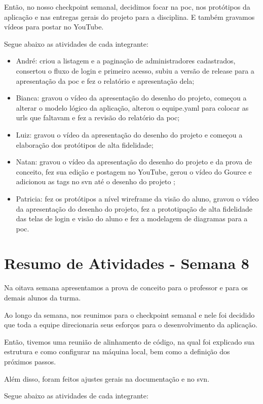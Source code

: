 \documentclass[
    12pt,               %
    openright,          %
    oneside,
    a4paper,            %
    english,            %
    brazil              %
    ]{ifsp-spo-inf-ctds} %
\begin{document}
\begin{apendicesenv}
Então, no nosso checkpoint semanal, decidimos focar na \ac{poc}, nos protótipos da aplicação e nas entregas gerais do projeto para a disciplina. E também gravamos vídeos para postar no YouTube.

Segue abaixo as atividades de cada integrante:

\begin{itemize}
\item André: criou a listagem e a paginação de administradores cadastrados, consertou o fluxo de login e primeiro acesso, subiu a versão de \gls{release} para a apresentação da \ac{poc} e fez o relatório e apresentação dela;
\item Bianca: gravou o vídeo da apresentação do desenho do projeto, começou a alterar o modelo lógico da aplicação, alterou o equipe.yaml para colocar as \ac{url}s que faltavam e fez a revisão do relatório da \ac{poc};
\item Luiz: gravou o vídeo da apresentação do desenho do projeto e começou a elaboração dos protótipos de alta fidelidade;
\item Natan: gravou o vídeo da apresentação do desenho do projeto e da prova de conceito, fez sua edição e postagem no YouTube, gerou o vídeo do Gource e adicionou as tags no \ac{svn} até o desenho do projeto ;
\item Patricia: fez os protótipos a nível \gls{wireframe} da visão do aluno, gravou o vídeo da apresentação do desenho do projeto, fez a prototipação de alta fidelidade das telas de login e visão do aluno e fez a modelagem de diagramas para a \ac{poc}.
\end{itemize}

\section{Resumo de Atividades - Semana 8}
Na oitava semana apresentamos a prova de conceito para o professor e para os demais alunos da turma.

Ao longo da semana, nos reunimos para o \gls{checkpoint} semanal e nele foi decidido que toda a equipe direcionaria seus esforços para o desenvolvimento da aplicação.

Então, tivemos uma reunião de alinhamento de código, na qual foi explicado sua estrutura e como configurar na máquina local, bem como a definição dos próximos passos.

Além disso, foram feitos ajustes gerais na documentação e no \ac{svn}.

Segue abaixo as atividades de cada integrante:


\end{apendicesenv}
\end{document}
